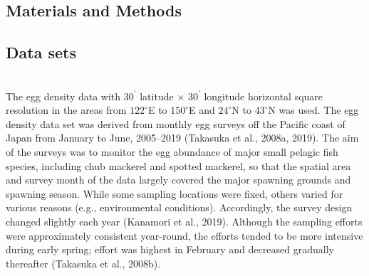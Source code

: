 \documentclass[12pt]{article}
\begin{document}
\begin{linenumbers}
{\section{Materials and Methods}
\subsection{Data sets}
\\
The egg density data with $\textrm{30}^\prime$ latitude $\times$ $\textrm{30}^\prime$ longitude horizontal square resolution in the areas from $\textrm{122}^\circ$E to $\textrm{150}^\circ$E and $\textrm{24}^\circ$N to $\textrm{43}^\circ$N was used. The egg density data set was derived from monthly egg surveys off the Pacific coast of Japan from January to June, 2005--2019 (Takasuka et al., 2008a, 2019). The aim of the surveys was to monitor the egg abundance of major small pelagic fish species, including chub mackerel and spotted mackerel, so that the spatial area and survey month of the data largely covered the major spawning grounds and spawning season. While some sampling locations were fixed, others varied for various reasons (e.g., environmental conditions). Accordingly, the survey design changed slightly each year (Kanamori et al., 2019). Although the sampling efforts were approximately consistent year-round, the efforts tended to be more intensive during early spring; effort was highest in February and decreased gradually thereafter (Takasuka et al., 2008b).

}
\end{linenumbers}
\end{document}
